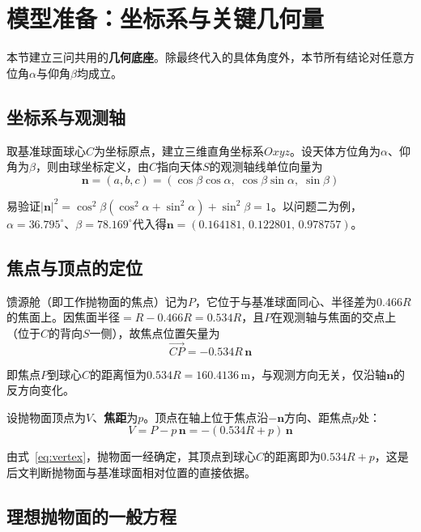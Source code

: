 \documentclass[withoutpreface]{cumcmthesis}
\begin{document}
\section{模型准备：坐标系与关键几何量}

本节建立三问共用的\textbf{几何底座}。除最终代入的具体角度外，本节所有结论对任意方位角$\alpha$与仰角$\beta$均成立。

\subsection{坐标系与观测轴}

取基准球面球心$C$为坐标原点，建立三维直角坐标系$Oxyz$。设天体方位角为$\alpha$、仰角为$\beta$，则由球坐标定义，由$C$指向天体$S$的观测轴线单位向量为
\begin{equation}\label{eq:axis}
\mathbf{n}=(a,b,c)=(\cos\beta\cos\alpha,\;\cos\beta\sin\alpha,\;\sin\beta)
\end{equation}

易验证$|\mathbf{n}|^{2}=\cos^{2}\beta(\cos^{2}\alpha+\sin^{2}\alpha)+\sin^{2}\beta=1$。以问题二为例，$\alpha=36.795^{\circ}$、$\beta=78.169^{\circ}$代入得$\mathbf{n}=(0.164181,\,0.122801,\,0.978757)$。

\subsection{焦点与顶点的定位}

馈源舱（即工作抛物面的焦点）记为$P$，它位于与基准球面同心、半径差为$0.466R$的焦面上。因焦面半径$=R-0.466R=0.534R$，且$P$在观测轴与焦面的交点上（位于$C$的背向$S$一侧），故焦点位置矢量为
\begin{equation}\label{eq:focus}
\overrightarrow{CP}=-0.534R\,\mathbf{n}
\end{equation}

即焦点$P$到球心$C$的距离恒为$0.534R=160.4136\,\mathrm{m}$，与观测方向无关，仅沿轴$\mathbf{n}$的反方向变化。

设抛物面顶点为$V$、\textbf{焦距}为$p$。顶点在轴上位于焦点沿$-\mathbf{n}$方向、距焦点$p$处：
\begin{equation}\label{eq:vertex}
V=P-p\,\mathbf{n}=-(0.534R+p)\,\mathbf{n}
\end{equation}

由式~\eqref{eq:vertex}，抛物面一经确定，其顶点到球心$C$的距离即为$0.534R+p$，这是后文判断抛物面与基准球面相对位置的直接依据。

\subsection{理想抛物面的一般方程}
\end{document}
